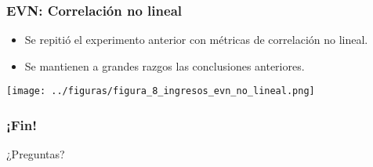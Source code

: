 \documentclass[10pt,mathserif]{beamer}%
\begin{document}
\begin{frame}
    \frametitle{EVN: Correlación no lineal}
    \begin{multicols}{2}
        \begin{minipage}{\linewidth}
            \begin{itemize}
                \item Se repitió el experimento anterior con métricas de correlación no lineal.
                \item Se mantienen a grandes razgos las conclusiones anteriores.
            \end{itemize}
        \end{minipage}
        \begin{minipage}{\linewidth}
            \centering
            \texttt{[image: ../figuras/figura\_8\_ingresos\_evn\_no\_lineal.png]} %
        \end{minipage}

    \end{multicols}

\end{frame}

\begin{frame}
\frametitle{¡Fin!}
\begin{center}
{\Huge ¿Preguntas?}

\end{center}
\end{frame}


\end{document}

